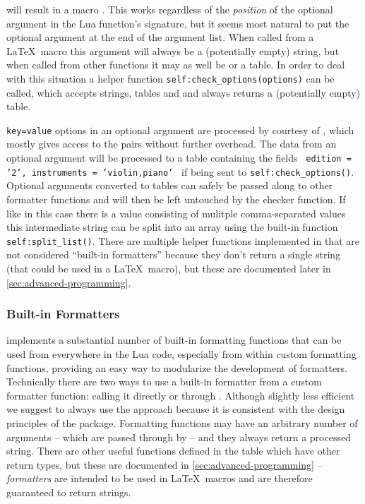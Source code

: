 \documentclass{scrartcl}
\begin{document}
\noindent will result in a macro \texttt{}.
This works regardless of the \emph{position} of the optional argument in the Lua
function's signature, but it seems most natural to put the optional argument at
the end of the argument list.  When called from a \LaTeX\ macro this argument
will always be a (potentially empty) string, but when called from other
functions it may as well be  or a table.  In order to deal with this
situation a helper function \texttt{self:check_options(options)} can be
called, which accepts strings, tables and  and always returns a
(potentially empty) table.

\texttt{key=value} options in an optional argument are processed by courtesy of
, which mostly gives access to the pairs without further
overhead.  The data from an optional argument
\texttt{\foo[edition=2,instruments={violin,piano}]} will be processed
to a table containing the fields \texttt{{ edition = '2', instruments =
'violin,piano' }} if being sent to \texttt{self:check_options()}.
Optional arguments converted to tables can safely be passed along to other
formatter functions and will then be left untouched by the checker function.  If
like in this case there is a value consisting of mulitple comma-separated values
this intermediate string can be split into an array using the built-in function
\texttt{self:split_list()}.  There are multiple helper functions
implemented in  that are not considered “built-in
formatters” because they don't return a single string (that could be used in a
\LaTeX\ macro), but these are documented later in
\vref{sec:advanced-programming}.


\subsubsection{Built-in Formatters}
\label{sec:builtin-formatters}

 implements a substantial number of built-in formatting
functions that can be used from everywhere in the Lua code, especially from
within custom formatting functions, providing an easy way to modularize the
development of formatters.  Technically there are two ways to use a built-in
formatter from a custom formatter function: calling it directly or through
.  Although slightly less efficient we suggest to always
use the  approach because it is consistent with the design
principles of the package.  Formatting functions may have an arbitrary number of
arguments -- which are passed through by  -- and they always
return a processed string.  There are other useful functions defined in the
 table which have other return types, but these are documented
in \vref{sec:advanced-programming} -- \emph{formatters} are intended to be used
in \LaTeX\ macros and are therefore guaranteed to return strings.
\end{document}

